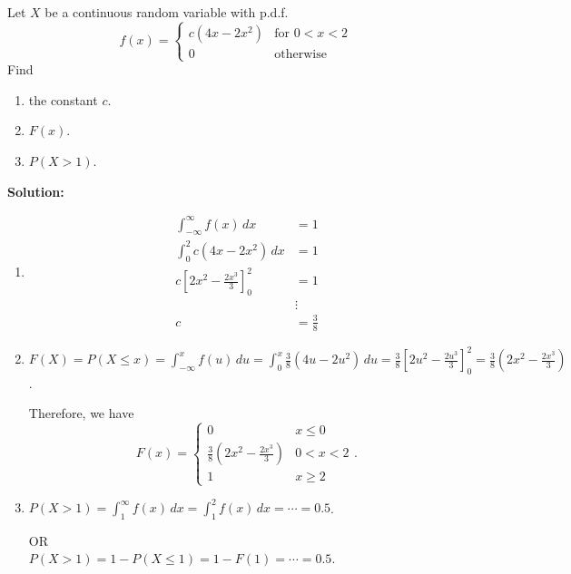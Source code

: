 \begin{example}
    Let $X$ be a continuous random variable with p.d.f.
    \[
        f(x) = 
        \begin{cases} 
        c(4x - 2x^2) & \text{for } 0 < x < 2 \\
        0 & \text{otherwise}
        \end{cases}
    \]
    Find
    \begin{enumerate}[label=(\alph*)]
        \item the constant $c$.
        \item $F(x)$.
        \item $P(X > 1)$.
    \end{enumerate}

    \textbf{Solution:} 
    \begin{enumerate}[label=(\alph*)]
        \item 
        \begin{align*}
            \displaystyle \int_{-\infty}^{\infty} f(x) \, dx &= 1 \\
            \displaystyle \int_{0}^{2} c(4x - 2x^2) \, dx &= 1 \\
            c \left[ 2x^2 - \frac{2x^3}{3} \right]_0^2 &= 1 \\
            &\vdots \\
            c &= \frac{3}{8}
        \end{align*}
        \item $F(X) = P(X \leq x) = \displaystyle \int_{-\infty}^{x} f(u) \, du = \displaystyle \int_{0}^{x} \frac{3}{8} (4u - 2u^2) \, du = \frac{3}{8} \left[ 2u^2 - \frac{2u^3}{3} \right]_0^2 = \frac{3}{8} \left( 2x^2 - \frac{2x^3}{3} \right)$.
        
        Therefore, we have 
        \[
            F(x) = 
            \begin{cases} 
            0 & x \leq 0 \\
            \frac{3}{8} \left( 2x^2 - \frac{2x^3}{3} \right) & 0 < x < 2 \\
            1 & x \geq 2
            \end{cases}.
        \]
        \item $P(X > 1) = \displaystyle \int_{1}^{\infty} f(x) \, dx = \displaystyle \int_{1}^{2} f(x) \, dx = \cdots = 0.5$.
        
        OR \\
        $P(X > 1) = 1 - P(X \leq 1) = 1 - F(1) = \cdots = 0.5$.
    \end{enumerate}
\end{example}

